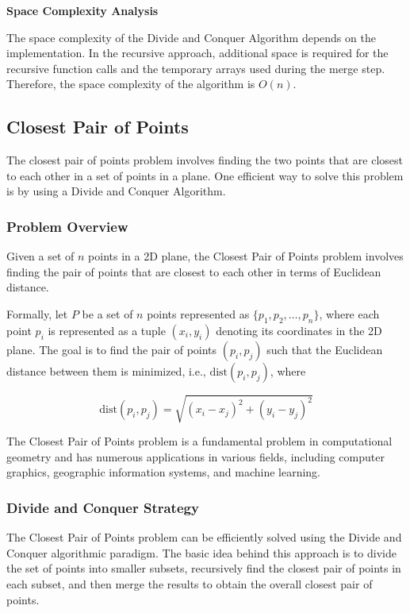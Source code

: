 \documentclass[12pt]{book} %
\begin{document}
\textbf{Space Complexity Analysis}

The space complexity of the Divide and Conquer Algorithm depends on the implementation. In the recursive approach, additional space is required for the recursive function calls and the temporary arrays used during the merge step. Therefore, the space complexity of the algorithm is $O(n)$.

\subsection{Closest Pair of Points}
The closest pair of points problem involves finding the two points that are closest to each other in a set of points in a plane. One efficient way to solve this problem is by using a Divide and Conquer Algorithm. 

\subsubsection{Problem Overview}

Given a set of \( n \) points in a 2D plane, the Closest Pair of Points problem involves finding the pair of points that are closest to each other in terms of Euclidean distance.

Formally, let \( P \) be a set of \( n \) points represented as \( \{ p_1, p_2, \ldots, p_n \} \), where each point \( p_i \) is represented as a tuple \( (x_i, y_i) \) denoting its coordinates in the 2D plane. The goal is to find the pair of points \( (p_i, p_j) \) such that the Euclidean distance between them is minimized, i.e., \( \text{dist}(p_i, p_j) \), where

\[
\text{dist}(p_i, p_j) = \sqrt{(x_i - x_j)^2 + (y_i - y_j)^2}
\]

The Closest Pair of Points problem is a fundamental problem in computational geometry and has numerous applications in various fields, including computer graphics, geographic information systems, and machine learning.

\subsubsection{Divide and Conquer Strategy}

The Closest Pair of Points problem can be efficiently solved using the Divide and Conquer algorithmic paradigm. The basic idea behind this approach is to divide the set of points into smaller subsets, recursively find the closest pair of points in each subset, and then merge the results to obtain the overall closest pair of points.
\end{document}
